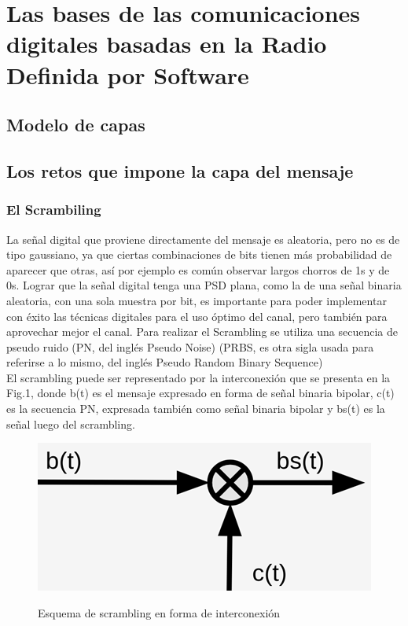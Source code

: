 \chapter{Las bases de las comunicaciones digitales basadas en la Radio Definida por Software}


\section{Modelo de capas}


\section{Los retos que impone la capa del mensaje}
\subsection{El Scrambiling}
La señal digital que proviene directamente del mensaje es aleatoria, pero no es de tipo gaussiano, ya que ciertas combinaciones de bits tienen más probabilidad de aparecer que otras, así por ejemplo es común observar largos chorros de 1s y de 0s. Lograr que la señal digital tenga una PSD plana, como la de una señal binaria aleatoria, con una sola muestra por bit, es importante para poder implementar con éxito las técnicas digitales para el uso óptimo del canal, pero también para aprovechar mejor el canal. 
Para realizar el Scrambling se utiliza una secuencia de pseudo ruido (PN, del inglés Pseudo Noise) (PRBS, es otra sigla usada para referirse a lo mismo, del inglés Pseudo Random Binary Sequence)\\

El scrambling puede ser representado por la interconexión que se presenta en la Fig.1, donde b(t) es el mensaje expresado en forma de señal binaria bipolar, c(t) es la secuencia PN, expresada también como señal binaria bipolar y bs(t) es la señal luego del scrambling. \\


\begin{figure}[h!]
	\captionsetup{justification = raggedright, singlelinecheck = false}
	\caption{Esquema de scrambling en forma de interconexión} 
	\centering
	\includegraphics[scale=0.9]{Imagenes/Esquema.png}
	\label{fig:Esquema}
\end{figure}

